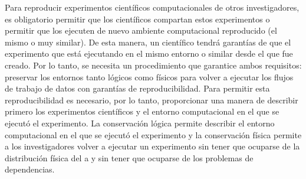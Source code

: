 Para reproducir experimentos científicos computacionales de otros investigadores, es obligatorio permitir que los científicos compartan estos experimentos o permitir que los ejecuten de nuevo ambiente computacional reproducido (el mismo o muy similar). De esta manera, un científico tendrá garantías de que el experimento que está ejecutando en el mismo entorno o similar desde el que fue creado.
Por lo tanto, se necesita un procedimiento que garantice ambos requisitos: preservar los entornos tanto lógicos como físicos para volver a ejecutar los flujos de trabajo de datos con garantías de reproducibilidad.
Para permitir esta reproducibilidad es necesario, por lo tanto, proporcionar una manera de describir primero los experimentos científicos y el entorno computacional en el que se ejecutó el experimento. La conservación lógica permite describir el entorno computacional en el que se ejecutó el experimento y la conservación física permite a los investigadores volver a ejecutar un experimento sin tener que ocuparse de la distribución física del a y sin tener que ocuparse de los problemas de dependencias. 



